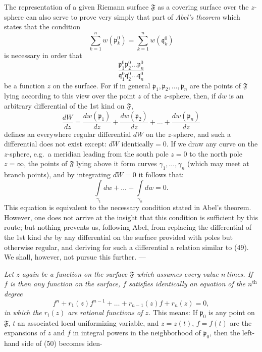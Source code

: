 \documentclass{article}
\begin{document}
The representation of a given Riemann surface $\mathfrak{F}$ as a covering surface over the $z$-sphere can also serve to prove very simply that part of \emph{Abel's theorem} which states that the condition
\[ \sum_{k=1}^n w(\mathfrak{p}_k^0) = \sum_{k=1}^n w(\mathfrak{q}_k^0) \]
is necessary in order that
\[ \frac{\mathfrak{p}_1^0 \mathfrak{p}_2^0 \dots \mathfrak{p}_n^0}{\mathfrak{q}_1^0 \mathfrak{q}_2^0 \dots \mathfrak{q}_n^0} \]
be a function $z$ on the surface. For if in general $\mathfrak{p}_1, \mathfrak{p}_2, \dots, \mathfrak{p}_n$ are the points of $\mathfrak{F}$ lying according to this view over the point $z$ of the $z$-sphere, then, if $dw$ is an arbitrary differential of the 1st kind on $\mathfrak{F}$,
\[ \frac{dW}{dz} = \frac{dw(\mathfrak{p}_1)}{dz} + \frac{dw(\mathfrak{p}_2)}{dz} + \dots + \frac{dw(\mathfrak{p}_n)}{dz} \]
defines an everywhere regular differential $dW$ on the $z$-sphere, and such a differential does not exist except: $dW \text{ identically} = 0$. If we draw any curve on the $z$-sphere, e.g.\ a meridian leading from the south pole $z = 0$ to the north pole $z = \infty$, the points of $\mathfrak{F}$ lying above it form curves $\gamma_1, \dots, \gamma_n$ (which may meet at branch points), and by integrating $dW = 0$ it follows that:
\[ \int\limits_{\gamma_1} dw + \dots + \int\limits_{\gamma_n} dw = 0. \tag{49} \]
This equation is equivalent to the necessary condition stated in Abel's theorem. However, one does not arrive at the insight that this condition is sufficient by this route; but nothing prevents us, following Abel, from replacing the differential of the 1st kind $dw$ by any differential on the surface provided with poles but otherwise regular, and deriving for such a differential a relation similar to (49). We shall, however, not pursue this further. ---

\emph{Let $z$ again be a function on the surface $\mathfrak{F}$ which assumes every value $n$\,times. If $f$ is then any function on the surface, $f$ satisfies identically an equation of the $n^{\text{th}}$ degree}
\[ f^n + r_1(z) f^{n-1} + \dots + r_{n-1}(z) f + r_n(z) = 0, \tag{50} \]
\emph{in which the $r_i(z)$ are rational functions of $z$.} This means: If $\mathfrak{p}_0$ is any point on $\mathfrak{F}$, $t$ an associated local uniformizing variable, and $z = z(t)$, $f = f(t)$ are the expansions of $z$ and $f$ in integral powers in the neighborhood of $\mathfrak{p}_0$, then the left-hand side of (50) becomes iden-
\end{document}
